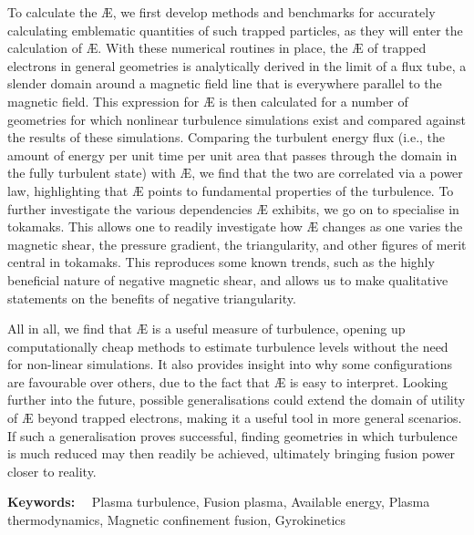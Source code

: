 To calculate the \AE{}, we first develop methods and benchmarks for accurately calculating emblematic quantities of such trapped particles, as they will enter the calculation of \AE{}. With these numerical routines in place, the \AE{} of trapped electrons in general geometries is analytically derived in the limit of a flux tube, a slender domain around a magnetic field line that is everywhere parallel to the magnetic field. This expression for \AE{} is then calculated for a number of geometries for which nonlinear turbulence simulations exist and compared against the results of these simulations. Comparing the turbulent energy flux (i.e., the amount of energy per unit time per unit area that passes through the domain in the fully turbulent state) with \AE{}, we find that the two are correlated via a power law, highlighting that \AE{} points to fundamental properties of the turbulence. To further investigate the various dependencies \AE{} exhibits, we go on to specialise in tokamaks. This allows one to readily investigate how \AE{} changes as one varies the magnetic shear, the pressure gradient, the triangularity, and other figures of merit central in tokamaks. This reproduces some known trends, such as the highly beneficial nature of negative magnetic shear, and allows us to make qualitative statements on the benefits of negative triangularity. \par 
All in all, we find that \AE{} is a useful measure of turbulence, opening up computationally cheap methods to estimate turbulence levels without the need for non-linear simulations. It also provides insight into why some configurations are favourable over others, due to the fact that \AE{} is easy to interpret. Looking further into the future, possible generalisations could extend the domain of utility of \AE{} beyond trapped electrons, making it a useful tool in more general scenarios. If such a generalisation proves successful, finding geometries in which turbulence is much reduced may then readily be achieved, ultimately bringing fusion power closer to reality.

\vspace*{11pt}\noindent
\textbf{Keywords:} \ \ Plasma turbulence, Fusion plasma, Available energy, Plasma thermodynamics, Magnetic confinement fusion, Gyrokinetics